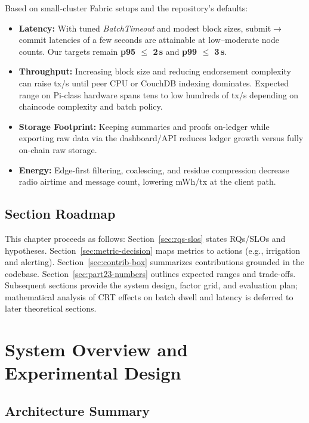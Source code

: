 \documentclass[12pt,onecolumn]{IEEEtran} %
\begin{document}
Based on small-cluster Fabric setups and the repository’s defaults:
\begin{itemize}
    \item \textbf{Latency:} With tuned \emph{BatchTimeout} and modest block sizes, submit$\to$commit latencies of a few seconds are attainable at low–moderate node counts. Our targets remain \textbf{p95 $\leq$ 2\,s} and \textbf{p99 $\leq$ 3\,s}.
    \item \textbf{Throughput:} Increasing block size and reducing endorsement complexity can raise tx/s until peer CPU or CouchDB indexing dominates. Expected range on Pi-class hardware spans tens to low hundreds of tx/s depending on chaincode complexity and batch policy.
    \item \textbf{Storage Footprint:} Keeping summaries and proofs on-ledger while exporting raw data via the dashboard/API reduces ledger growth versus fully on-chain raw storage.
    \item \textbf{Energy:} Edge-first filtering, coalescing, and residue compression decrease radio airtime and message count, lowering mWh/tx at the client path.\cite{coinspaid2023dag}
\end{itemize}

\subsection{Section Roadmap}
\label{sec:roadmap}

This chapter proceeds as follows: Section~\ref{sec:rqs-slos} states RQs/SLOs and hypotheses. Section~\ref{sec:metric-decision} maps metrics to actions (e.g., irrigation and alerting). Section~\ref{sec:contrib-box} summarizes contributions grounded in the codebase. Section~\ref{sec:part23-numbers} outlines expected ranges and trade-offs. Subsequent sections provide the system design, factor grid, and evaluation plan; mathematical analysis of CRT effects on batch dwell and latency is deferred to later theoretical sections.

\section{System Overview and Experimental Design}
\label{sec:system-overview}

\subsection{Architecture Summary}
\label{subsec:architecture-summary}
\end{document}
